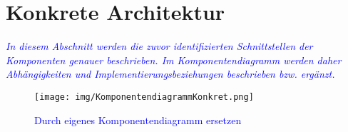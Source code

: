 \section{Konkrete Architektur}
\textcolor{blue}{\textit{In diesem Abschnitt werden die zuvor identifizierten Schnittstellen der Komponenten genauer beschrieben. Im Komponentendiagramm werden daher Abhängigkeiten und Implementierungsbeziehungen beschrieben bzw. ergänzt.
}}

\begin{figure}[H]
\centering
\texttt{[image: img/KomponentendiagrammKonkret.png]}
\caption{\textcolor{blue}{Durch eigenes Komponentendiagramm ersetzen}}
\label{KomponentendiagrammKonkret}
\end{figure}
